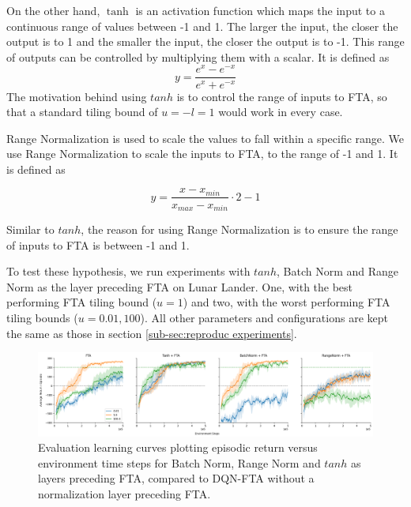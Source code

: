 \documentclass{article}
\begin{document}
On the other hand, $\tanh$ is an activation function which maps the input to a continuous range of values between -1 and 1.
The larger the input, the closer the output is to 1 and the smaller the input, the closer the output is to -1.
This range of outputs can be controlled by multiplying them with a scalar.
It is defined as
 \begin{equation}
    y = \frac{e^x-e^{-x}}{e^x+e^{-x}}
    \label{eq:tanh}
 \end{equation}
The motivation behind using $tanh$ is to control the range of inputs to FTA, so that a standard tiling bound of $u = -l = 1$ would work in every case.

Range Normalization is used to scale the values to fall within a specific range.
We use Range Normalization to scale the inputs to FTA, to the range of -1 and 1. It is defined as

 \begin{equation}
    y = \frac{x - x_{min}}{x_{max} - x_{min}} \cdot 2 - 1
    \label{eq:rangenorm}
 \end{equation}

 Similar to $tanh$, the reason for using Range Normalization is to ensure the range of inputs to FTA is between -1 and 1.

To test these hypothesis, we run experiments with $tanh$, Batch Norm and Range Norm as the layer preceding FTA on Lunar Lander.
One, with the best performing FTA tiling bound ($u = 1$) and two, with the worst performing FTA tiling bounds ($u = 0.01, 100$).
All other parameters and configurations are kept the same as those in section \ref{sub-sec:reproduc experiments}.

\begin{figure}[h]
    \centering
    \includegraphics[width=12cm]{normalizing.png}
    \caption{Evaluation learning curves plotting episodic return versus environment time steps for Batch Norm, Range Norm and $tanh$ as layers preceding FTA, compared to DQN-FTA without a normalization layer preceding FTA.}
    \label{fig:bnvtanh}
\end{figure}
\end{document}
